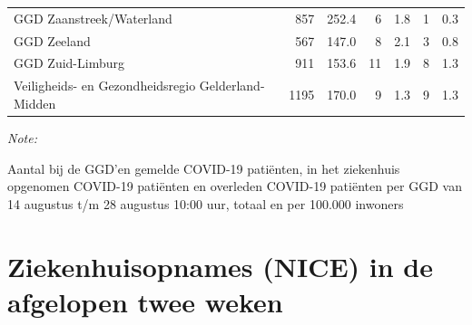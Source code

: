 \documentclass[
  english,
  man,floatsintext]{apa6}
\begin{document}
\begin{table}
\begin{threeparttable}
\begin{tabular}{lrrrrrr}
GGD Zaanstreek/Waterland & 857 & 252.4 & 6 & 1.8 & 1 & 0.3\\
GGD Zeeland & 567 & 147.0 & 8 & 2.1 & 3 & 0.8\\
GGD Zuid-Limburg & 911 & 153.6 & 11 & 1.9 & 8 & 1.3\\
Veiligheids- en Gezondheidsregio Gelderland-Midden & 1195 & 170.0 & 9 & 1.3 & 9 & 1.3\\
\bottomrule
\end{tabular}
\begin{tablenotes}
\item \textit{Note: } 
\item Aantal bij de GGD’en gemelde COVID-19 patiënten, in het ziekenhuis opgenomen COVID-19 patiënten en overleden COVID-19 patiënten per GGD van 14 augustus t/m 28 augustus 10:00 uur, totaal en per 100.000 inwoners
\end{tablenotes}
\end{threeparttable}
\endgroup{}
\end{table}

\newpage

\hypertarget{ziekenhuisopnames-nice-in-de-afgelopen-twee-weken}{%
\section{Ziekenhuisopnames (NICE) in de afgelopen twee weken}\label{ziekenhuisopnames-nice-in-de-afgelopen-twee-weken}}
\end{document}

